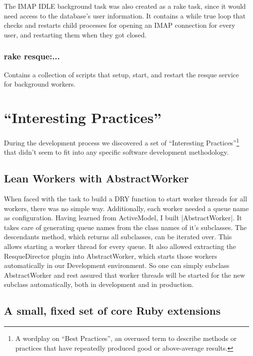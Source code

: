 The IMAP IDLE background task was also created as a rake task, since it would need access to the database's user information. It contains a while true loop that checks and restarts child processes for opening an IMAP connection for every user, and restarting them when they got closed.

\subsubsection{rake resque:...}

Contains a collection of scripts that setup, start, and restart the resque service for background workers.



\section{``Interesting Practices''}

During the development process we discovered a set of ``Interesting Practices''\footnote{A wordplay on ``Best Practices'', an overused term to describe methods or practices that have repeatedly produced good or above-average results.} that didn't seem to fit into any specific software development methodology.

\subsection{Lean Workers with AbstractWorker}

When faced with the task to build a DRY function to start worker threads for all workers, there was no simple way. Additionally, each worker needed a queue name as configuration. Having learned from ActiveModel, I built |AbstractWorker|. It takes care of generating queue names from the class names of it’s subclasses. The descendants method, which returns all subclasses, can be iterated over. This allows starting a worker thread for every queue. It also allowed extracting the ResqueDirector plugin into AbstractWorker, which starts those workers automatically in our Development environment. So one can simply subclass AbstractWorker and rest assured that worker threads will be started for the new subclass automatically, both in development and in production.

\subsection{A small, fixed set of core Ruby extensions}

